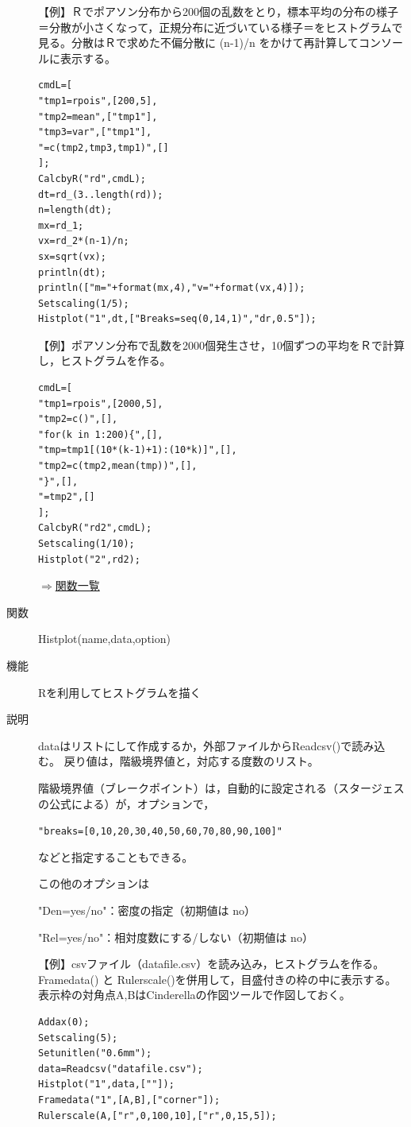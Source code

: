 \documentclass[papersize,a4paper,10pt,uplatex]{jsarticle}
\begin{document}
\begin{description}
\vspace{\baselineskip}
【例】Ｒでポアソン分布から200個の乱数をとり，標本平均の分布の様子＝分散が小さくなって，正規分布に近づいている様子＝をヒストグラムで見る。分散はＲで求めた不偏分散に (n-1)/n をかけて再計算してコンソールに表示する。
\begin{verbatim}
cmdL=[
"tmp1=rpois",[200,5],
"tmp2=mean",["tmp1"],
"tmp3=var",["tmp1"],
"=c(tmp2,tmp3,tmp1)",[]
];
CalcbyR("rd",cmdL);
dt=rd_(3..length(rd));
n=length(dt);
mx=rd_1;
vx=rd_2*(n-1)/n;
sx=sqrt(vx);
println(dt);
println(["m="+format(mx,4),"v="+format(vx,4)]);
Setscaling(1/5);
Histplot("1",dt,["Breaks=seq(0,14,1)","dr,0.5"]);
\end{verbatim}
\vspace{\baselineskip}
\begin{center}  \end{center}
\vspace{\baselineskip}
【例】ポアソン分布で乱数を2000個発生させ，10個ずつの平均をＲで計算し，ヒストグラムを作る。
\begin{verbatim}
cmdL=[
"tmp1=rpois",[2000,5],
"tmp2=c()",[],
"for(k in 1:200){",[],
"tmp=tmp1[(10*(k-1)+1):(10*k)]",[],
"tmp2=c(tmp2,mean(tmp))",[],
"}",[],
"=tmp2",[]
];
CalcbyR("rd2",cmdL);
Setscaling(1/10);
Histplot("2",rd2);
\end{verbatim}

\begin{flushright}\hyperlink{functionlist}{$\Rightarrow$関数一覧}\end{flushright}
\hypertarget{histplot}{}
\item[関数]Histplot(name,data,option)
\item[機能]Rを利用してヒストグラムを描く
\item[説明]dataはリストにして作成するか，外部ファイルからReadcsv()で読み込む。
戻り値は，階級境界値と，対応する度数のリスト。

階級境界値（ブレークポイント）は，自動的に設定される（スタージェスの公式による）が，オプションで，

\verb|"breaks=[0,10,20,30,40,50,60,70,80,90,100]"|

などと指定することもできる。

この他のオプションは

"Den=yes/no"：密度の指定（初期値は no）

"Rel=yes/no"：相対度数にする/しない（初期値は no）

\vspace{\baselineskip}
【例】csvファイル（datafile.csv）を読み込み，ヒストグラムを作る。Framedata() と Rulerscale()を併用して，目盛付きの枠の中に表示する。表示枠の対角点A,BはCinderellaの作図ツールで作図しておく。
\begin{verbatim}
Addax(0);
Setscaling(5);
Setunitlen("0.6mm");
data=Readcsv("datafile.csv");
Histplot("1",data,[""]);
Framedata("1",[A,B],["corner"]);
Rulerscale(A,["r",0,100,10],["r",0,15,5]);
\end{verbatim}
\begin{center}  \end{center}


\end{description}
\end{document}
